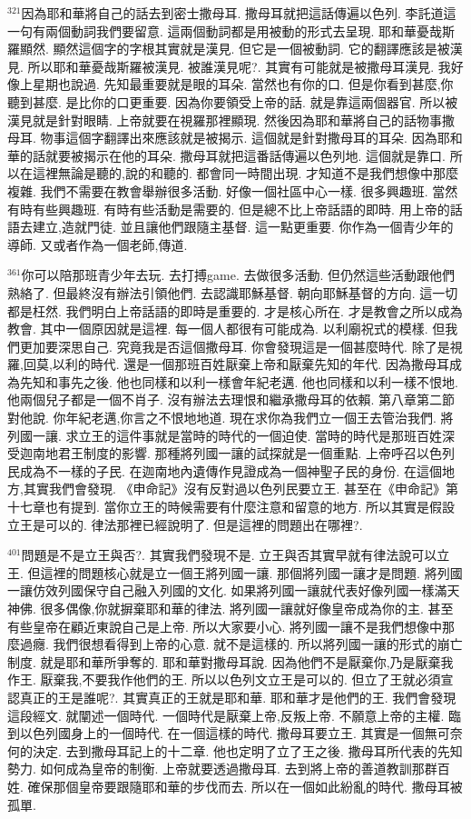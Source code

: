 \documentclass{book}
\begin{document}
$^{321}$因為耶和華將自己的話去到密士撒母耳.
撒母耳就把這話傳遍以色列.
李託道這一句有兩個動詞我們要留意.
這兩個動詞都是用被動的形式去呈現.
耶和華憂哉斯羅顯然.
顯然這個字的字根其實就是漢見.
但它是一個被動詞.
它的翻譯應該是被漢見.
所以耶和華憂哉斯羅被漢見.
被誰漢見呢?.
其實有可能就是被撒母耳漢見.
我好像上星期也說過.
先知最重要就是眼的耳朵.
當然也有你的口.
但是你看到甚麼,你聽到甚麼.
是比你的口更重要.
因為你要領受上帝的話.
就是靠這兩個器官.
所以被漢見就是針對眼睛.
上帝就要在視羅那裡顯現.
然後因為耶和華將自己的話物事撒母耳.
物事這個字翻譯出來應該就是被揭示.
這個就是針對撒母耳的耳朵.
因為耶和華的話就要被揭示在他的耳朵.
撒母耳就把這番話傳遍以色列地.
這個就是靠口.
所以在這裡無論是聽的,說的和聽的.
都會同一時間出現.
才知道不是我們想像中那麼複雜.
我們不需要在教會舉辦很多活動.
好像一個社區中心一樣.
很多興趣班.
當然有時有些興趣班.
有時有些活動是需要的.
但是總不比上帝話語的即時.
用上帝的話語去建立,造就門徒.
並且讓他們跟隨主基督.
這一點更重要.
你作為一個青少年的導師.
又或者作為一個老師,傳道.

$^{361}$你可以陪那班青少年去玩.
去打搏game.
去做很多活動.
但仍然這些活動跟他們熟絡了.
但最終沒有辦法引領他們.
去認識耶穌基督.
朝向耶穌基督的方向.
這一切都是枉然.
我們明白上帝話語的即時是重要的.
才是核心所在.
才是教會之所以成為教會.
其中一個原因就是這裡.
每一個人都很有可能成為.
以利廟祝式的模樣.
但我們更加要深思自己.
究竟我是否這個撒母耳.
你會發現這是一個甚麼時代.
除了是視羅,回莫,以利的時代.
還是一個那班百姓厭棄上帝和厭棄先知的年代.
因為撒母耳成為先知和事先之後.
他也同樣和以利一樣會年紀老邁.
他也同樣和以利一樣不恨地.
他兩個兒子都是一個不肖子.
沒有辦法去理恨和繼承撒母耳的依賴.
第八章第二節對他說.
你年紀老邁,你言之不恨地地道.
現在求你為我們立一個王去管治我們.
將列國一讓.
求立王的這件事就是當時的時代的一個迫使.
當時的時代是那班百姓深受迦南地君王制度的影響.
那種將列國一讓的試探就是一個重點.
上帝呼召以色列民成為不一樣的子民.
在迦南地內遺傳作見證成為一個神聖子民的身份.
在這個地方,其實我們會發現.
《申命記》沒有反對過以色列民要立王.
甚至在《申命記》第十七章也有提到.
當你立王的時候需要有什麼注意和留意的地方.
所以其實是假設立王是可以的.
律法那裡已經說明了.
但是這裡的問題出在哪裡?.

$^{401}$問題是不是立王與否?.
其實我們發現不是.
立王與否其實早就有律法說可以立王.
但這裡的問題核心就是立一個王將列國一讓.
那個將列國一讓才是問題.
將列國一讓仿效列國保守自己融入列國的文化.
如果將列國一讓就代表好像列國一樣滿天神佛.
很多偶像,你就摒棄耶和華的律法.
將列國一讓就好像皇帝成為你的主.
甚至有些皇帝在顧近東說自己是上帝.
所以大家要小心.
將列國一讓不是我們想像中那麼過癮.
我們很想看得到上帝的心意.
就不是這樣的.
所以將列國一讓的形式的崩亡制度.
就是耶和華所爭奪的.
耶和華對撒母耳說.
因為他們不是厭棄你,乃是厭棄我作王.
厭棄我,不要我作他們的王.
所以以色列文立王是可以的.
但立了王就必須宣認真正的王是誰呢?.
其實真正的王就是耶和華.
耶和華才是他們的王.
我們會發現這段經文.
就闡述一個時代.
一個時代是厭棄上帝,反叛上帝.
不願意上帝的主權.
臨到以色列國身上的一個時代.
在一個這樣的時代.
撒母耳要立王.
其實是一個無可奈何的決定.
去到撒母耳記上的十二章.
他也定明了立了王之後.
撒母耳所代表的先知勢力.
如何成為皇帝的制衡.
上帝就要透過撒母耳.
去到將上帝的善道教訓那群百姓.
確保那個皇帝要跟隨耶和華的步伐而去.
所以在一個如此紛亂的時代.
撒母耳被孤單.
\end{document}
